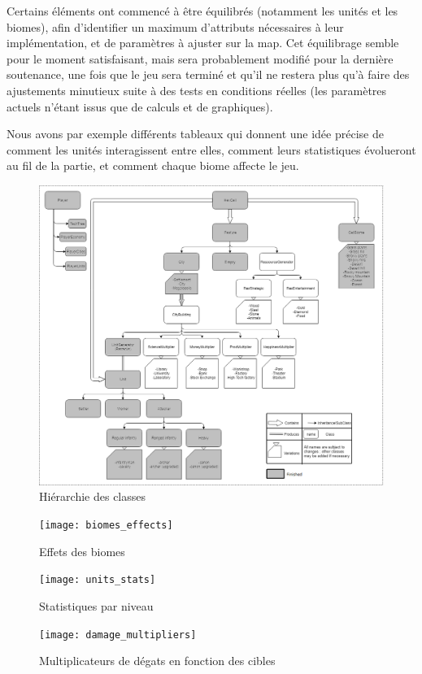 \documentclass[12pt]{report}
\begin{document}
Certains éléments ont commencé à être équilibrés (notamment les unités et les biomes), afin d’identifier un maximum d’attributs nécessaires à leur implémentation, et de paramètres à ajuster sur la map. Cet équilibrage semble pour le moment satisfaisant, mais sera probablement modifié pour la dernière soutenance, une fois que le jeu sera terminé et qu’il ne restera plus qu’à faire des ajustements minutieux suite à des tests en conditions réelles (les paramètres actuels n’étant issus que de calculs et de graphiques).

Nous avons par exemple différents tableaux qui donnent une idée précise de comment les unités interagissent entre elles, comment leurs statistiques évolueront au fil de la partie, et comment chaque biome affecte le jeu.

\begin{figure}[H]
    \centering
    \includegraphics[width=1\textwidth]{class_hierarchy}
    \caption{Hiérarchie des classes}
\end{figure}

\begin{figure}[H]
    \centering
    \texttt{[image: biomes\_effects]}
    \caption{Effets des biomes}
\end{figure}
\begin{figure}[H]
    \centering
    \texttt{[image: units\_stats]}
    \caption{Statistiques par niveau}
\end{figure}
\begin{figure}[H]
    \centering
    \texttt{[image: damage\_multipliers]}
    \caption{Multiplicateurs de dégats en fonction des cibles}
\end{figure}
\end{document}
